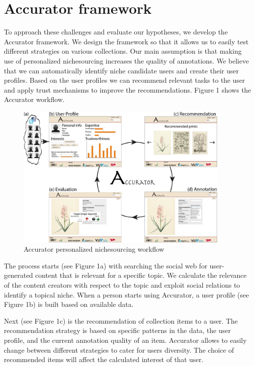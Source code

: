\section{Accurator framework}
\label{architecture}
To approach these challenges and evaluate our hypotheses, we develop the Accurator framework. We design the framework so that it allows us to easily test different strategies on various collections. Our main assumption is that making use of personalized nichesourcing increases the quality of annotations. We believe that we can automatically identify niche candidate users and create their user profiles. Based on the user profiles we can recommend relevant tasks to the user and apply trust mechanisms to improve the recommendations. Figure 1 shows the Accurator workflow. 

\begin{figure}[hbt]
	\centering
	\includegraphics[width=0.93\textwidth]{accurator_diagram.jpg}
  	\caption{Accurator personalized nichesourcing workflow}
\end{figure}

The process starts (see Figure 1a) with searching the social web for user-generated content that is relevant for a specific topic. We calculate the relevance of the content creators with respect to the topic and exploit social relations to identify a topical niche. When a person starts using Accurator, a user profile (see Figure 1b) is built based on available data.

Next (see Figure 1c) is the recommendation of collection items to a user. The recommendation strategy is based on specific patterns in the data, the user profile, and the current annotation quality of an item. Accurator allows to easily change between different strategies to cater for users diversity.
The choice of recommended items will affect the calculated interest of that user.

